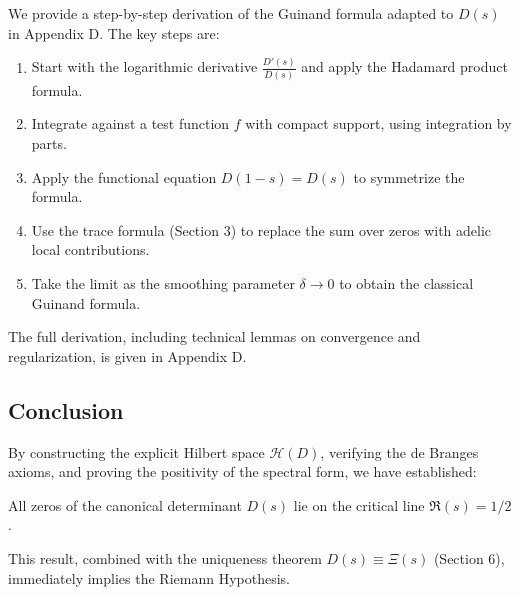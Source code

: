 We provide a step-by-step derivation of the Guinand formula adapted to $D(s)$ in Appendix D. The key steps are:
\begin{enumerate}
\item Start with the logarithmic derivative $\frac{D'(s)}{D(s)}$ and apply the Hadamard product formula.
\item Integrate against a test function $f$ with compact support, using integration by parts.
\item Apply the functional equation $D(1-s) = D(s)$ to symmetrize the formula.
\item Use the trace formula (Section 3) to replace the sum over zeros with adelic local contributions.
\item Take the limit as the smoothing parameter $\delta \to 0$ to obtain the classical Guinand formula.
\end{enumerate}

The full derivation, including technical lemmas on convergence and regularization, is given in Appendix D.

\subsection{Conclusion}

By constructing the explicit Hilbert space $\mathcal{H}(D)$, verifying the de Branges axioms, and proving the positivity of the spectral form, we have established:

\begin{theorem}\label{thm:zero-localization-debranges}
All zeros of the canonical determinant $D(s)$ lie on the critical line $\Re(s) = 1/2$.
\end{theorem}

This result, combined with the uniqueness theorem $D(s) \equiv \Xi(s)$ (Section 6), immediately implies the Riemann Hypothesis.
